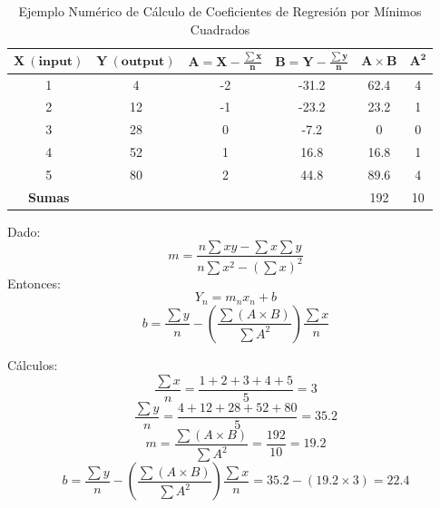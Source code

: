 \documentclass[12pt]{article}
\begin{document}
        \begin{table}[!h]
                \caption{Ejemplo Numérico de Cálculo de Coeficientes de Regresión por Mínimos Cuadrados}
                \begin{center}
                        \begin{tabular}{|c|c|c|c|c|c|}
                                \hline
                                $\mathbf{X\ (input)}$\rule{0pt}{20pt} &
                                $\mathbf{Y\ (output)}$\rule{0pt}{20pt} &
                                $\mathbf{A = X - \frac{\sum x}{n}}$\rule{0pt}{20pt} &
                                $\mathbf{B = Y - \frac{\sum y}{n}}$\rule{0pt}{20pt} &
                                $\mathbf{A \times B}$\rule{0pt}{20pt} &
                                $\mathbf{A^2}$\rule{0pt}{20pt} \\
                                \hline
                                1 & 4 & -2 & -31.2 & 62.4  & 4\\
                                \hline
                                2 & 12 & -1 & -23.2 & 23.2  & 1\\
                                \hline
                                3 & 28 & 0 & -7.2 & 0 & 0\\
                                \hline
                                4 & 52 & 1 & 16.8 & 16.8  & 1\\
                                \hline
                                5 & 80 & 2 & 44.8 & 89.6  & 4\\
                                \hline
                                \textbf{Sumas} &  &  &  & 192 & 10\\
                                \hline
                        \end{tabular}
                        \label{tab:ejemplo}
                \end{center}
        \end{table}
        
        Dado:
        \[
        m = \frac{n \sum xy - \sum x \sum y}{n \sum x^{2} - (\sum x)^2}
        \]
        Entonces:
        \[
        Y_n = m_n x_n + b 
        \]
        \[
        b = \frac{\sum y}{n} - \left( \frac{\sum (A \times B)}{\sum A^2} \right) \frac{\sum x}{n} 
        \]
        
        Cálculos:
        \[
        \frac{\sum x}{n} = \frac{1 + 2 + 3 + 4 + 5}{5} = 3
        \]
        \[
        \frac{\sum y}{n} = \frac{4 + 12 + 28 + 52 + 80}{5} = 35.2
        \]
        \[
        m = \frac{\sum (A \times B)}{\sum A^2} = \frac{192}{10} = 19.2
        \]
        \[
        b = \frac{\sum y}{n} - \left( \frac{\sum (A \times B)}{\sum A^2} \right) \frac{\sum x}{n} = 35.2 - (19.2 \times 3) = 22.4
        \]
        
\end{document}
